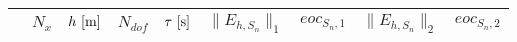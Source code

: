 

%

\begin{tabular}{rrrrrrcrc}
\toprule

\multicolumn{1}{c}{}
  &  \multicolumn{1}{c}{$ N_x $}
  &  \multicolumn{1}{c}{$ h~[\textup{m}] $}
  &  \multicolumn{1}{c}{$ N_{dof} $}
  &  \multicolumn{1}{c}{$ \tau~[\textup{s}] $}
  &  \multicolumn{1}{c}{$ \lVert E_{h,S_n} \rVert_1 $}
  &  \multicolumn{1}{c}{$ eoc_{S_n,1} $}
  &  \multicolumn{1}{c}{$ \lVert E_{h,S_n} \rVert_2 $}
  &  \multicolumn{1}{c}{$ eoc_{S_n,2} $}
  \\

\midrule


\end{tabular}
